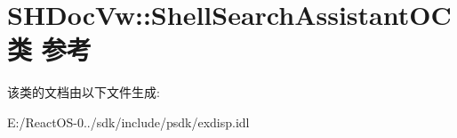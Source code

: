 \hypertarget{class_s_h_doc_vw_1_1_shell_search_assistant_o_c}{}\section{S\+H\+Doc\+Vw\+:\+:Shell\+Search\+Assistant\+O\+C类 参考}
\label{class_s_h_doc_vw_1_1_shell_search_assistant_o_c}


该类的文档由以下文件生成\+:\begin{DoxyCompactItemize}
\item 
E\+:/\+React\+O\+S-\/0../sdk/include/psdk/exdisp.\+idl\end{DoxyCompactItemize}
